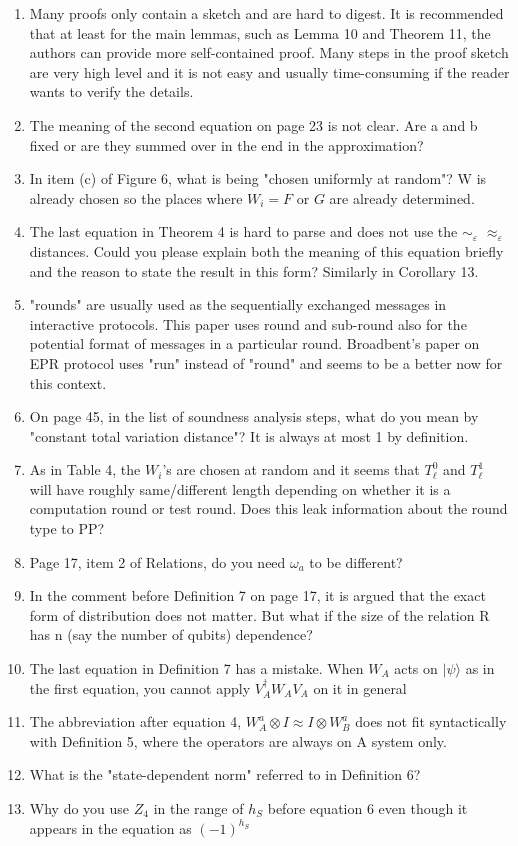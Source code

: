\documentclass[12pt]{article}
\newcommand{\eps}{\varepsilon}
\newcommand{\ket}[1]{|#1\rangle}
\begin{document}
\begin{enumerate}
\item Many proofs only contain a sketch and are hard to digest. It is recommended that at least for the main lemmas, such as Lemma 10 and Theorem 11, the authors can provide more self-contained proof. Many steps in the proof sketch are very high level and it is not easy and usually time-consuming if the reader wants to verify the details.
\item The meaning of the second equation on page 23 is not clear. Are a and b fixed or are they summed over in the end in the approximation?
\item In item (c) of Figure 6, what is being "chosen uniformly at random"? W is already chosen so the places where $W_i = F$ or $G$ are already determined.
\item The last equation in Theorem 4 is hard to parse and does not use the $\sim_\eps$ $\approx_\eps$ distances. Could you please explain both the meaning of this equation briefly and the reason to state the result in this form? Similarly in Corollary 13.
\item "rounds" are usually used as the sequentially exchanged messages in interactive protocols. This paper uses round and sub-round also for the potential format of messages in a particular round. Broadbent's paper on EPR protocol uses "run" instead of "round" and seems to be a better now for this context.
\item On page 45, in the list of soundness analysis steps, what do you mean by "constant total variation distance"? It is always at most 1 by definition.
\item As in Table 4, the $W_i$'s are chosen at random and it seems that $T^0_\ell$ and $T^1_\ell$ will have roughly same/different length depending on whether it is a computation round or test round. Does this leak information about the round type to PP?
\item Page 17, item 2 of Relations, do you need $\omega_a$ to be different?
\item In the comment before Definition 7 on page 17, it is argued that the exact form of distribution does not matter. But what if the size of the relation R has n (say the number of qubits) dependence?
\item The last equation in Definition 7 has a mistake. When $W_A$ acts on $\ket{\psi}$ as in the first equation, you cannot apply $V^\dagger_A W_A V_A$ on it in general
\item The abbreviation after equation 4, $W^a_A \otimes I \approx I \otimes W^a_B$ does not fit syntactically with Definition 5, where the operators are always on A system only.
\item What is the "state-dependent norm" referred to in Definition 6?
\item Why do you use $Z_4$ in the range of $h_S$ before equation 6 even though it appears in the equation as $(-1)^{h_S}$
\end{enumerate}
\end{document}
